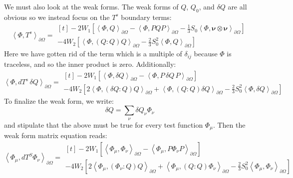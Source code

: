 \documentclass[reqno]{article}
\begin{document}
We must also look at the weak forms. 
The weak forms of $Q$, $Q_0$, and $\delta Q$ are all obvious so we instead focus on the $T^s$ boundary terms:
\begin{equation}
    \left<\Phi, T^s \right>_{\partial \Omega}
    =
    \begin{multlined}[t]
        -2 W_1 \left[
            \left<\Phi, Q\right>_{\partial \Omega}
            - \left<\Phi, PQP \right>_{\partial \Omega}
            - \tfrac13 S_0 \left<\Phi, \boldsymbol\nu \otimes \boldsymbol\nu\right>_{\partial \Omega}
        \right] \\
        - 4 W_2 \left[ 
            \left< \Phi, \left(Q : Q\right) Q \right>_{\partial \Omega}
            - \tfrac23 S_0^2 \left< \Phi, Q \right>_{\partial \Omega}
        \right]
    \end{multlined}
\end{equation}
Here we have gotten rid of the term which is a multiple of $\delta_{ij}$ because $\Phi$ is traceless, and so the inner product is zero.
Additionally:
\begin{equation}
    \left<\Phi, dT^s \, \delta Q\right>_{\partial \Omega}
    =
    \begin{multlined}[t]
        -2 W_1 \left[
            \left< \Phi, \delta Q \right>_{\partial \Omega}
            - \left< \Phi, P \, \delta Q \, P \right>_{\partial \Omega}
        \right] \\
        - 4 W_2 \left[ 
            2\left<\Phi, \left( \delta Q : Q \right) Q \right>_{\partial \Omega}
            + \left<\Phi, \left( Q : Q \right) \delta Q \right>_{\partial \Omega}
            - \frac23 S_0^2 \left<\Phi, \delta Q \right>_{\partial \Omega}
        \right] 
    \end{multlined}
\end{equation}
To finalize the weak form, we write:
\begin{equation}
    \delta Q
    =
    \sum_\nu \delta Q_\nu \Phi_\nu
\end{equation}
and stipulate that the above must be true for every test function $\Phi_\mu$.
Then the weak form matrix equation reads:
\begin{equation}
    \left< \Phi_\mu, dT^S \Phi_\nu \right>_{\partial \Omega}
    =
    \begin{multlined}[t]
        -2 W_1 \left[ 
            \left< \Phi_\mu, \Phi_\nu \right>_{\partial \Omega}
            - \left< \Phi_\mu, P \Phi_\nu P \right>_{\partial \Omega}
        \right] \\
        - 4 W_2 \left[
            2 \left< \Phi_\mu, \left( \Phi_\nu : Q \right) Q \right>_{\partial \Omega}
            + \left< \Phi_\mu, \left( Q : Q \right) \Phi_\nu \right>_{\partial \Omega}
            - \tfrac23 S_0^2 \left< \Phi_\mu, \Phi_\nu \right>_{\partial \Omega}
        \right]
    \end{multlined}
\end{equation}
\end{document}
